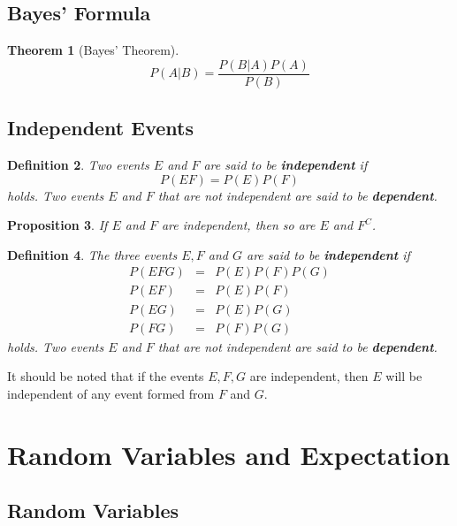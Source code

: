 \documentclass[12pt]{article}
\newtheorem{theorem}{Theorem}
\newtheorem{definition}[theorem]{Definition}
\newtheorem{proposition}[theorem]{Proposition}
\begin{document}
\subsection{Bayes' Formula}

\begin{theorem} [Bayes' Theorem]
  \begin{equation*}
    P(A|B) = \frac {P(B|A)P(A)}{P(B)}
  \end{equation*}
\end{theorem}

\subsection{Independent Events}

\begin{definition}
  Two events $E$ and $F$ are said to be \textbf{independent} if
  \begin{equation*}
    P(EF) = P(E)P(F)
  \end{equation*}
  holds. Two events $E$ and $F$ that are not independent are said to be \textbf{dependent}.
\end{definition}

\begin{proposition}
  If $E$ and $F$ are independent, then so are $E$ and $F^C$.
\end{proposition}

\begin{definition}
  The three events $E,F$ and $G$ are said to be \textbf{independent} if
  \begin{eqnarray*}
    P(EFG) &=& P(E)P(F)P(G) \\
    P(EF) &=& P(E)P(F) \\
    P(EG) &=& P(E)P(G) \\
    P(FG) &=& P(F)P(G)
  \end{eqnarray*}
  holds. Two events $E$ and $F$ that are not independent are said to be \textbf{dependent}.
\end{definition}

It should be noted that if the events $E,F,G$ are independent, then $E$ will be independent of any event formed from $F$ and $G$.

\section{Random Variables and Expectation}

\subsection{Random Variables}
\end{document}
